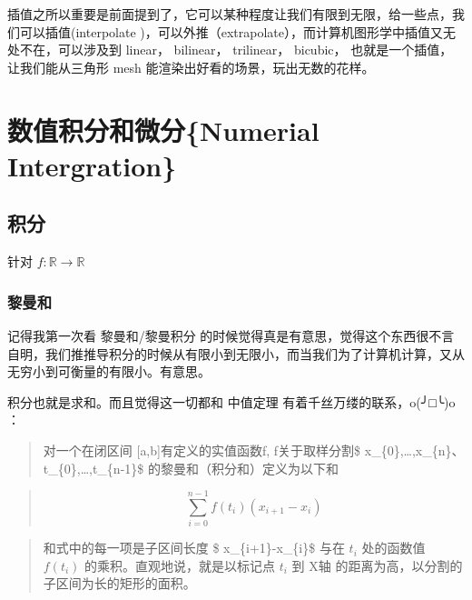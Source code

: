 \documentclass[
]{book}
\begin{document}
插值之所以重要是前面提到了，它可以某种程度让我们有限到无限，给一些点，我们可以插值(interpolate )，可以外推（extrapolate），而计算机图形学中插值又无处不在，可以涉及到 linear， bilinear， trilinear， bicubic， 也就是一个插值，让我们能从三角形 mesh 能渲染出好看的场景，玩出无数的花样。

\hypertarget{ux6570ux503cux79efux5206ux548cux5faeux5206numerial-intergration}{%
\chapter{数值积分和微分\{Numerial Intergration\}}\label{ux6570ux503cux79efux5206ux548cux5faeux5206numerial-intergration}}

\hypertarget{ux79efux5206}{%
\section{积分}\label{ux79efux5206}}

针对 \(f: \mathbb{R} \to \mathbb{R}\)

\hypertarget{ux9eceux66fcux548c}{%
\subsection{黎曼和}\label{ux9eceux66fcux548c}}

记得我第一次看 黎曼和/黎曼积分 的时候觉得真是有意思，觉得这个东西很不言自明，我们推推导积分的时候从有限小到无限小，而当我们为了计算机计算，又从无穷小到可衡量的有限小。有意思。

积分也就是求和。而且觉得这一切都和 中值定理 有着千丝万缕的联系，o(╯□╰)o ：

\begin{quote}
对一个在闭区间 {[}a,b{]}有定义的实值函数f, f关于取样分割\$ x\_\{0\},\ldots ,x\_\{n\}、t\_\{0\},\ldots ,t\_\{n-1\}\$ 的黎曼和（积分和）定义为以下和
\end{quote}

\begin{quote}
\[
\sum _{i=0}^{n-1}f(t_{i})(x_{i+1}-x_{i})
\]
\end{quote}

\begin{quote}
和式中的每一项是子区间长度 \$ x\_\{i+1\}-x\_\{i\}\$ 与在 \(t_{i}\) 处的函数值 \(f(t_{i})\) 的乘积。直观地说，就是以标记点 \(t_{i}\) 到 X轴 的距离为高，以分割的子区间为长的矩形的面积。
\end{quote}
\end{document}
